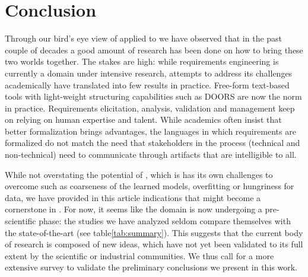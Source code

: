 \section{Conclusion}
\label{sec:conclusion}

Through our bird's eye view of \ML applied to \RE we have observed that in the
past couple of decades a good amount of research has been done on how to bring
these two worlds together. The stakes are high: while requirements engineering
is currently a domain under intensive research, attempts to address its
challenges academically have translated into few results in practice. Free-form
text-based tools with light-weight structuring capabilities such as DOORS are
now the norm in practice. Requirements elicitation, analysis, validation and
management keep on relying on human expertise and talent. While academics often insist that
better formalization brings advantages, the languages in which requirements are
formalized do not match the need that stakeholders in the \RE process
(technical and non-technical) need to communicate through artifacts that are
intelligible to all.

While not overstating the potential of \ML, which is has its own challenges to
overcome such as coarseness of the learned models, overfitting or hungriness
for data, we have provided in this article indications that \ML might become a cornerstone in \RE. For now, it
seems like the domain is now undergoing a pre-scientific phase: the studies we
have analyzed seldom compare themselves with the state-of-the-art (see table\ref{tab:summary}). This suggests that the current body of research is composed of
new ideas, which have not yet been validated to its full extent by the
scientific or industrial communities. We thus call for a more extensive survey to validate
the preliminary conclusions we present in this work.
